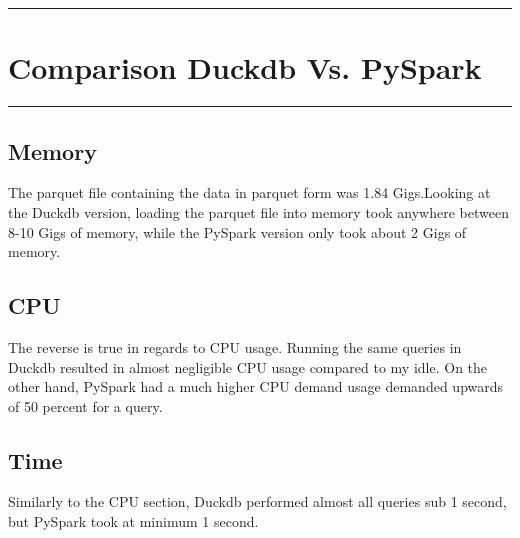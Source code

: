 {\color{gray}\hrule}
\section{Comparison Duckdb Vs. PySpark}
{\color{gray}\hrule}

\subsection{Memory}
The parquet file containing the data in parquet form was 1.84 Gigs.Looking at the Duckdb version, loading the parquet file into memory took anywhere between 8-10 Gigs of memory, while the PySpark version only took about 2 Gigs of memory. 

\subsection{CPU}
The reverse is true in regards to CPU usage. Running the same queries in Duckdb resulted in almost negligible CPU usage compared to my idle. On the other hand, PySpark had a much higher CPU demand usage demanded upwards of 50 percent for a query.

\subsection{Time}
Similarly to the CPU section, Duckdb performed almost all queries sub 1 second, but PySpark took at minimum 1 second. 


